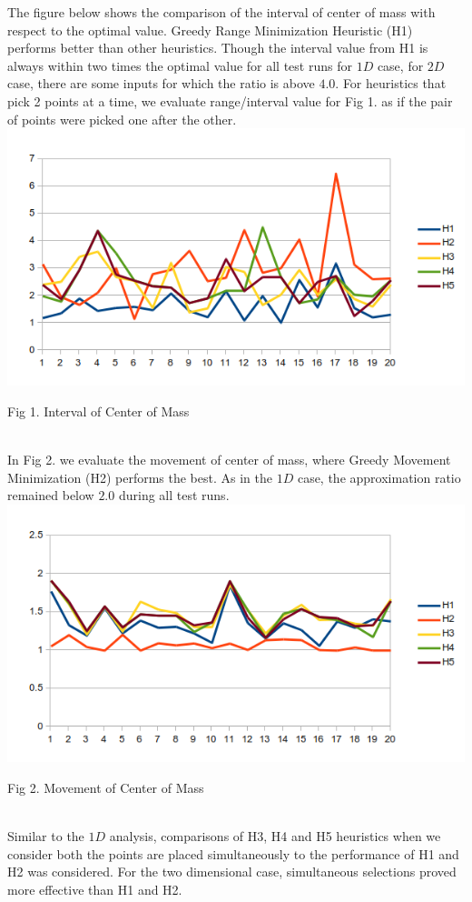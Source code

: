 \documentclass[11pt]{article} %
\begin{document}
 The figure below shows the comparison of the interval of center of mass with
 respect to the optimal value.  Greedy Range Minimization Heuristic (H1)
 performs better than other heuristics. Though the interval value from H1 is always
 within two times the optimal value for all test runs for $1D$ case, for $2D$ case,
 there are some inputs for which the ratio is above $4.0$.  For heuristics that
 pick 2 points at a time, we evaluate range/interval value for Fig 1. as if the
 pair of points were picked one after the other.
 \\
\includegraphics{result0.png}
\begin{center}
\caption{Fig 1. Interval of Center of Mass}
\end{center}
\\
 In Fig 2. we evaluate the movement of center of mass, where Greedy Movement
 Minimization (H2) performs the best. As in the $1D$ case, the approximation
 ratio remained below $2.0$ during all test runs.
\\
\includegraphics{result1.png}
\begin{center}
\caption{Fig 2. Movement of Center of Mass}
\end{center}
\\
Similar to the $1D$ analysis, comparisons of H3, H4 and H5 heuristics when we consider both
the points are placed simultaneously to the performance of H1 and H2 was considered. For the
two dimensional case, simultaneous selections proved more effective than H1 and H2.
\end{document}

